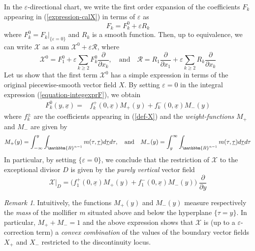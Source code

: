 \documentclass[11pt,psamsfonts]{article}
\theoremstyle{definition}
\theoremstyle{remark}
\newtheorem{Remark}[Theorem]{Remark}
\newcommand{\cR}{\ensuremath{\mathbbm{R}}}
\newcommand{\eps}{\varepsilon }
\newcommand{\vf}{f}
\begin{document}
In the $\eps$-directional chart, we write the first order expansion of the coefficients $F_k$ appearing in (\ref{expression-calX}) in terms of $\eps$ as
$$
F_k  = F^0_k + \eps R_k
$$
where $F^0_k = F_k|_{\{\eps = 0\}}$ and $R_k$ is a smooth function. Then, up to equivalence, we can write ${\mathcal{X}}$ as a sum $\mathcal{X}^0 + \eps \mathcal{R}$, where
$$
\mathcal{X}^0=F_1^0 + \eps \sum_{k \ge  2} F_k^0 \frac{\partial}{\partial x_k}, \quad\text{and}\quad
\mathcal{R}= R_1 \frac{\partial}{\partial x_1} + \eps \sum_{k\ge 2}{R_k \frac{\partial}{\partial x_k}}
$$
Let us show that the first term $\mathcal{X}^0$ has a simple expression in terms of the original piecewise-smooth vector field $X$.  By setting $\eps = 0$ in the integral expression (\ref{equation-integexprF}), we obtain 
\begin{align*}
 F_k^0(y,\underline{x}) =& \vf_k^+(0,\underline{x}) M_+(y) + 
 \vf_k^-(0,\underline{x}) M_-(y) 
\end{align*}
where $\vf_k^{\pm}$ are the coefficients appearing in (\ref{def-X}) and the {\em weight-functions} $M_+$ and $M_-$ are given by
$$
M_+(y)=\int_{-\infty}^y \int_{\cR^{n-1}} m(\tau,\underline{\tau}) d \underline{\tau} d\tau,\quad \text{and}\quad 
M_-(y)=\int_y^{\infty} \int_{\cR^{n-1}} m(\tau,\underline{\tau}) d \underline{\tau} d\tau
$$
In particular, by setting $\{\eps = 0\}$, we conclude that the restriction of ${\mathcal{X}}$ to the exceptional divisor $D$ is given by the {\em purely vertical} vector field
\begin{equation}\label{vX-purely-vertical}
{\mathcal{X}}|_D = \Big( \vf_1^+(0,\underline{x}) M_+(y) + 
 \vf_1^-(0,\underline{x}) M_-(y) \Big)\; \frac{\partial}{\partial y}
\end{equation}
\begin{Remark}
Intuitively, the functions $M_+(y)$ and $M_-(y)$ measure respectively the {\em mass} of the mollifier $m$ situated above and below the hyperplane 
$\{\tau = y\}$. In particular, $M_+ + M_- =1$ and the above expression shows that ${\mathcal{X}}$ is (up to a $\eps$-correction term) a {\em convex combination} of the values of the boundary vector fields $X_+$ and $X_-$ restricted to the discontinuity locus. 
\end{Remark}
\end{document}
